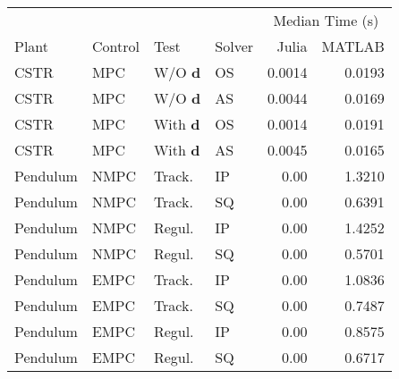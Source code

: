 \begin{tabular}{llllrr}
	
\toprule %

	  &	& & & \multicolumn{2}{c}{Median Time (s)} \\ \cmidrule(l){5-6}
Plant & Control & Test & Solver & Julia & MATLAB \\
\midrule %

CSTR		& MPC	& W/O $\mathbf{d}$	& OS & \num{0.0014} & \num{0.0193}	\\
CSTR		& MPC	& W/O $\mathbf{d}$	& AS & \num{0.0044} & \num{0.0169}	\\
CSTR		& MPC	& With $\mathbf{d}$ & OS & \num{0.0014} & \num{0.0191}	\\
CSTR		& MPC	& With $\mathbf{d}$ & AS & \num{0.0045} & \num{0.0165}	\\
Pendulum 	& NMPC	& Track. 	   		& IP & \num{0.00} & \num{1.3210}	\\
Pendulum 	& NMPC	& Track. 	   		& SQ & \num{0.00} & \num{0.6391}	\\
Pendulum    & NMPC	& Regul. 			& IP & \num{0.00} & \num{1.4252} 	\\
Pendulum    & NMPC	& Regul. 			& SQ & \num{0.00} & \num{0.5701} 	\\
Pendulum    & EMPC	& Track.			& IP & \num{0.00} & \num{1.0836} 	\\
Pendulum    & EMPC	& Track.			& SQ & \num{0.00} & \num{0.7487} 	\\
Pendulum	& EMPC	& Regul. 			& IP & \num{0.00} & \num{0.8575}  	\\
Pendulum	& EMPC	& Regul. 			& SQ & \num{0.00} & \num{0.6717}  	\\
	
\bottomrule %
	
\end{tabular}